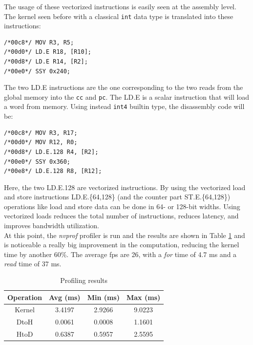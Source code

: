 \documentclass[paper=a4, fontsize=10pt]{scrartcl}	%
\begin{document}
	The usage of these vectorized instructions is easily seen at the assembly level. The kernel seen before with a classical \texttt{int} data type is translated into these instructions:

	\begin{lstlisting}[style=CStyle]
/*00c8*/ MOV R3, R5;
/*00d0*/ LD.E R18, [R10];
/*00d8*/ LD.E R14, [R2]; 
/*00e0*/ SSY 0x240;      \end{lstlisting}

	The two LD.E instructions are the one corresponding to the two reads from the global memory into the \texttt{cc} and \texttt{pc}. The LD.E is a scalar instruction that will load a word from memory. Using instead \texttt{int4} builtin type, the disassembly code will be:

	\begin{lstlisting}[style=CStyle]
/*00c8*/ MOV R3, R17;        
/*00d0*/ MOV R12, R0;        
/*00d8*/ LD.E.128 R4, [R2];  
/*00e0*/ SSY 0x360;          
/*00e8*/ LD.E.128 R8, [R12]; \end{lstlisting}

	Here, the two LD.E.128 are vectorized instructions. By using the vectorized load and store instructions LD.E.\{64,128\} (and the counter part ST.E.\{64,128\}) operations like load and store data can be done in 64- or 128-bit widths. Using vectorized loads reduces the total number of instructions, reduces latency, and improves bandwidth utilization.\\


	At this point, the \textit{nvprof} profiler is run and the results are shown in Table \ref{tab:nvprof_naif6} and is noticeable a really big improvement in the computation, reducing the kernel time by another 60\%. The average fps are 26, with a \textit{for} time of 4.7 ms and a \textit{read} time of 37 ms. 

	\begin{table}[H]
		\centering
		\begin{tabular}{||c | c c c||} 
			\hline
			Operation & Avg (ms) & Min (ms) & Max (ms) \\ [0.5ex] 
			\hline\hline
			Kernel & 3.4197 & 2.9266 & 9.0223 \\ 
			\hdashline
			DtoH & 0.0061 & 0.0008 & 1.1601 \\
			\hdashline
			HtoD & 0.6387 & 0.5957 & 2.5595 \\
			\hline
		\end{tabular}
		\caption{Profiling results}
		\label{tab:nvprof_naif6}
	\end{table}
\end{document}
